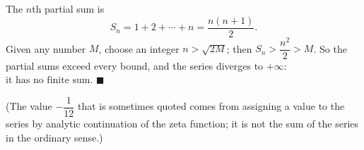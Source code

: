 The $n$th partial sum is
\[
S_n=1+2+\cdots+n=\dfrac{n(n+1)}{2}.
\]
Given any number $M$, choose an integer $n>\sqrt{2M}$; then $S_n>\dfrac{n^2}{2}>M$. So the partial sums exceed every bound, and the series diverges to $+\infty$: $\boxed{\text{it has no finite sum}}$. $\blacksquare$

(The value $-\dfrac{1}{12}$ that is sometimes quoted comes from assigning a value to the series by analytic continuation of the zeta function; it is not the sum of the series in the ordinary sense.)
